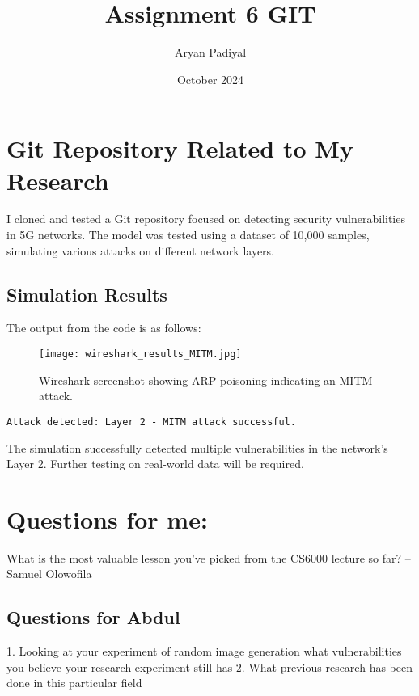 \documentclass[12pt]{article}
\title{Assignment 6 GIT}
\author{Aryan Padiyal}
\date{October 2024}
\begin{document}
\maketitle

\section{Git Repository Related to My Research}
I cloned and tested a Git repository focused on detecting security vulnerabilities in 5G networks. The model was tested using a dataset of 10,000 samples, simulating various attacks on different network layers.

\subsection{Simulation Results}
The output from the code is as follows:
\begin{figure}[H]
  \centering
  \texttt{[image: wireshark\_results\_MITM.jpg]} %
  \caption{Wireshark screenshot showing ARP poisoning indicating an MITM attack.}
\end{figure}

\begin{verbatim}
Attack detected: Layer 2 - MITM attack successful.
\end{verbatim}

The simulation successfully detected multiple vulnerabilities in the network's Layer 2. Further testing on real-world data will be required.

\section{Questions for me:}
What is the most valuable lesson you've picked from the CS6000 lecture so far? -- Samuel Olowofila

\subsection{Questions for Abdul}
1. Looking at your experiment of random image generation what vulnerabilities you believe your research experiment still has
2. What previous research has been done in this particular field
\end{document}
